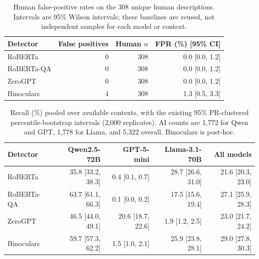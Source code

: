 \begin{table}[htbp]
\centering
\caption{Human false-positive rates on the 308 unique human descriptions. Intervals are 95\% Wilson intervals; these baselines are reused, not independent samples for each model or context.}
\label{tab:human_false_positive_intervals}
\small
\setlength{\tabcolsep}{4pt}
\renewcommand{\arraystretch}{1.15}
\begin{tabular}{lrrr}
\toprule
\textbf{Detector} & \textbf{False positives} & \textbf{Human $n$} & \textbf{FPR (\%) [95\% CI]} \\
\midrule
RoBERTa & 0 & 308 & 0.0 [0.0, 1.2] \\
RoBERTa-QA & 0 & 308 & 0.0 [0.0, 1.2] \\
ZeroGPT & 0 & 308 & 0.0 [0.0, 1.2] \\
Binoculars & 4 & 308 & 1.3 [0.5, 3.3] \\
\bottomrule
\end{tabular}
\end{table}

\begin{table}[htbp]
\centering
\caption{Recall (\%) pooled over available contexts, with the existing 95\% PR-clustered percentile-bootstrap intervals (2,000 replicates). AI counts are 1,772 for Qwen and GPT, 1,778 for Llama, and 5,322 overall. Binoculars is post-hoc.}
\label{tab:pooled_recall_intervals}
\small
\setlength{\tabcolsep}{4pt}
\renewcommand{\arraystretch}{1.15}
\begin{tabular}{lrrrr}
\toprule
\textbf{Detector} & \textbf{Qwen2.5-72B} & \textbf{GPT-5-mini} & \textbf{Llama-3.1-70B} & \textbf{All models} \\
\midrule
RoBERTa & 35.8 [33.2, 38.3] & 0.4 [0.1, 0.7] & 28.7 [26.6, 31.0] & 21.6 [20.3, 23.0] \\
RoBERTa-QA & 63.7 [61.1, 66.3] & 0.1 [0.0, 0.2] & 17.5 [15.6, 19.4] & 27.1 [25.9, 28.3] \\
ZeroGPT & 46.5 [44.0, 49.1] & 20.6 [18.7, 22.6] & 1.9 [1.2, 2.5] & 23.0 [21.7, 24.2] \\
Binoculars & 59.7 [57.3, 62.2] & 1.5 [1.0, 2.1] & 25.9 [23.8, 28.1] & 29.0 [27.8, 30.3] \\
\bottomrule
\end{tabular}
\end{table}
\FloatBarrier

